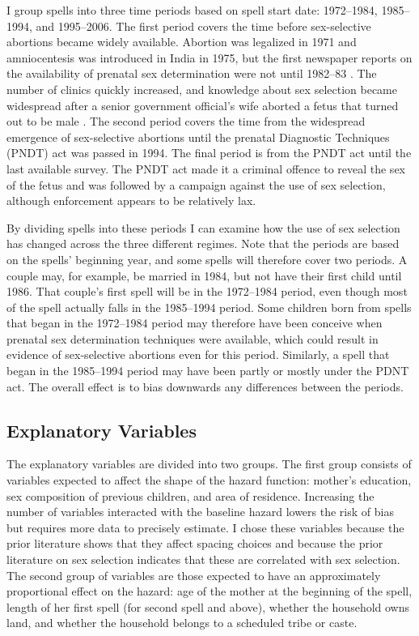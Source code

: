 \documentclass[12pt,letterpaper]{article}
\begin{document}
I group spells into three time periods based on spell start date:
1972--1984, 1985--1994, and 1995--2006.
The first period covers the time before sex-selective abortions became widely available.
Abortion was legalized in 1971 and amniocentesis was introduced
in India in 1975, but the first newspaper reports on the availability of prenatal sex 
determination were not until 1982--83 \citep{Sudha1999,bhat06,Grover2006}.
The number of clinics quickly increased, and knowledge about sex selection became widespread
after a senior government official's wife aborted a fetus that turned out to be male \citep[p.\ 598]{Sudha1999}.
The second period covers the time from the widespread emergence of sex-selective abortions
until the prenatal Diagnostic Techniques (PNDT) act was passed in 1994.
The final period is from the PNDT act until the last available survey.
The PNDT act made it a criminal offence to reveal the sex of the fetus and was
followed by a campaign against the use of sex selection, although
enforcement appears to be relatively lax.

By dividing spells into these periods I can examine how the use of sex selection 
has changed across the three different regimes.
Note that the periods are based on the spells' beginning year, and some spells 
will therefore cover two periods.
A couple may, for example, be married in 1984, but not have their first child until 1986.
That couple's first spell will be in the 1972--1984 period, even though most of the 
spell actually falls in the 1985--1994 period.
Some children born from spells that began in the 1972--1984 period may therefore have been
conceive when prenatal sex determination techniques were available, which could result
in evidence of sex-selective abortions even for this period.
Similarly, a spell that began in the 1985--1994 period may have been partly or mostly
under the PDNT act.
The overall effect is to bias downwards any differences between the periods.

\subsection{Explanatory Variables}

The explanatory variables are divided into two groups.
The first group consists of variables expected to affect the shape of the hazard function: 
mother's education, sex composition of previous children, and area of residence.
Increasing the number of variables interacted with the baseline hazard lowers the risk 
of bias but requires more data to precisely estimate.
I chose these variables because the prior literature shows that they affect 
spacing choices and because the prior literature on sex selection indicates 
that these are correlated with sex selection.
The second group of variables are those expected to have an approximately 
proportional effect on the hazard: age of the mother at the beginning of the spell, 
length of her first spell (for second spell and above), whether the household owns 
land, and whether the household belongs to a scheduled tribe or caste.
\end{document}
